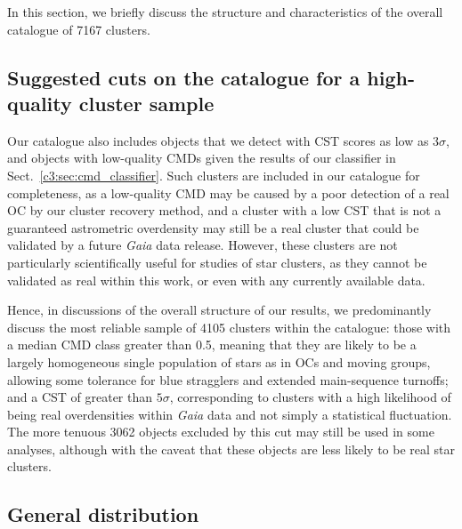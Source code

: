 In this section, we briefly discuss the structure and characteristics of the overall catalogue of 7167 clusters. 

\subsection{Suggested cuts on the catalogue for a high-quality cluster sample}\label{c3:sec:results-overall:suggested-cuts}

Our catalogue also includes objects that we detect with CST scores as low as $3\sigma$, and objects with low-quality CMDs given the results of our classifier in Sect.~\ref{c3:sec:cmd_classifier}. Such clusters are included in our catalogue for completeness, as a low-quality CMD may be caused by a poor detection of a real OC by our cluster recovery method, and a cluster with a low CST that is not a guaranteed astrometric overdensity may still be a real cluster that could be validated by a future \emph{Gaia} data release. However, these clusters are not particularly scientifically useful for studies of star clusters, as they cannot be validated as real within this work, or even with any currently available data. 

Hence, in discussions of the overall structure of our results, we predominantly discuss the most reliable sample of 4105 clusters within the catalogue: those with a median CMD class greater than 0.5, meaning that they are likely to be a largely homogeneous single population of stars as in OCs and moving groups, allowing some tolerance for blue stragglers and extended main-sequence turnoffs; and a CST of greater than $5\sigma$, corresponding to  clusters with a high likelihood of being real overdensities within \emph{Gaia} data and not simply a statistical fluctuation. The more tenuous 3062 objects excluded by this cut may still be used in some analyses, although with the caveat that these objects are less likely to be real star clusters.



\subsection{General distribution}

